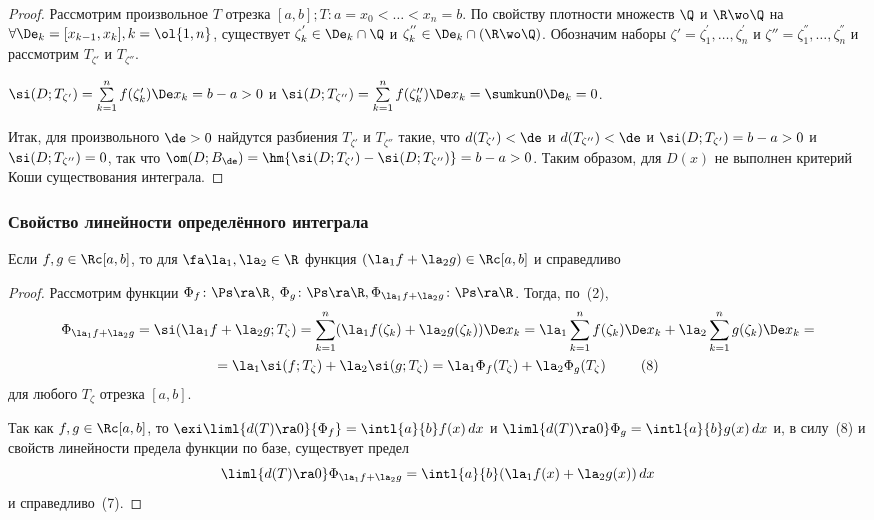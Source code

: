 \documentclass[a4paper]{article}
\begin{document}
\begin{proof}
Рассмотрим произвольное $T$ отрезка $[a,b]; T\colon
a=x_0<\dots<x_n=b$. По свойству плотности множеств $\Q$ и
$\R\wo\Q$ на
$\forall\De_k=[x_{k-1},x_k],k=\ol{1,n}$, существует
$\zeta^{'}_k\in\De_k\cap\Q$ и
$\zeta^{''}_k\in\De_k\cap(\R\wo\Q)$. Обозначим наборы
$\zeta'={\zeta^{'}_1,\dots,\zeta^{'}_n}$ и
$\zeta''={\zeta^{''}_1,\dots,\zeta^{''}_n}$ и рассмотрим
$T_{\zeta'}$ и $T_{\zeta''}$.

$\si(D;T_{\zeta'})=\sum\limits_{k=1}^{n} f(\zeta'_k)\De
x_k=b-a>0$ и $\si(D;T_{\zeta''})=\sum\limits_{k=1}^{n}
f(\zeta''_k)\De x_k=\sumkun 0\De_k=0$.

Итак, для произвольного $\de>0$ найдутся разбиения $T_{\zeta'}$ и $T_{\zeta''}$ такие, что
$d(T_{\zeta'})<\de$ и
$d(T_{\zeta''})<\de$ и $\si(D;T_{\zeta'})=b-a>0$ и
$\si(D;T_{\zeta''})=0$, так что $\om(D;B_{\de}) =
\hm{\si(D;T_{\zeta'})-\si(D;T_{\zeta''})}=b-a>0$. Таким
образом, для $D(x)$ не выполнен критерий Коши существования
интеграла.
\end{proof}

\subsubsection{Свойство линейности определённого интеграла}

\begin{theorem}
Если $f,g\in \Rc[a,b]$, то для $\fa \la_1,\la_2\in\R$
функция $(\la_{1}f+\la_{2}g)\in \Rc[a,b]$ и справедливо
\end{theorem}
\begin{proof}
Рассмотрим функции $\Phi_f\colon\Ps\ra\R$, $\Phi_g\colon\Ps\ra\R,
\Phi_{\la_{1}f+\la_{2}g}\colon\Ps\ra\R$. Тогда, по~(2),
\begin{multline*}
\Phi_{\la_{1}f+\la_{2}g}=\si(\la_{1}f+\la_{2}g;
T_\zeta)=\sum\limits_{k=1}^n
(\la_{1}f(\zeta_k)+\la_{2}g(\zeta_k))\De
x_k=\la_{1}\sum\limits_{k=1}^n f(\zeta_k)\De
x_k+\la_{2}\sum\limits_{k=1}^n g(\zeta_k)\De x_k=
\\
=\la_1\si(f;T_\zeta)+\la_2\si(g;T_\zeta)=
\la_1\Phi_f (T_\zeta)+\la_{2}\Phi_g (T_\zeta)
\;\;\;\;\;\;\;\;\;(8)
\end{multline*} для любого $T_\zeta$ отрезка $[a,b]$.

Так как $f,g\in \Rc[a,b]$, то $\exi \liml{d(T)\ra
0}{\Phi_f}=\intl{a}{b} f(x)\,dx$ и $\liml{d(T)\ra
0}\Phi_g=\intl{a}{b} g(x)\,dx$ и, в силу~(8) и свойств
линейности предела функции по базе, существует предел
$$\liml{d(T)\ra 0} \Phi_{\la_{1}f+\la_{2}g}=\intl{a}{b}(\la_{1}f(x)+\la_{2}g(x))\,dx$$
и справедливо~(7).
\end{proof}
\end{document}
